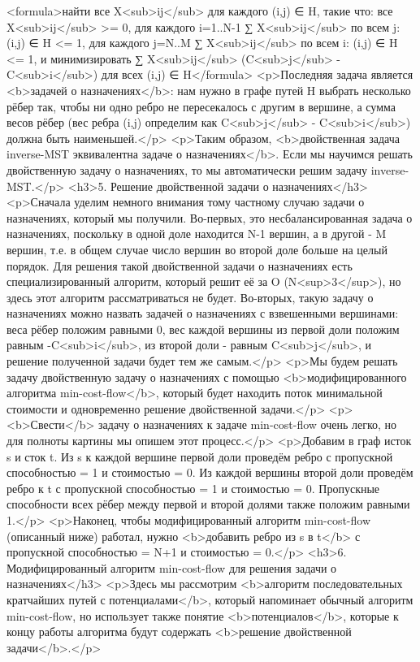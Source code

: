 <formula>найти все X<sub>ij</sub> для каждого (i,j) ∈ H, такие что:
все X<sub>ij</sub> >= 0,
для каждого i=1..N-1 ∑ X<sub>ij</sub> по всем j: (i,j) ∈ H <= 1,
для каждого j=N..M ∑ X<sub>ij</sub> по всем i: (i,j) ∈ H <= 1,
и минимизировать ∑ X<sub>ij</sub> (C<sub>j</sub> - C<sub>i</sub>) для всех (i,j) ∈ H</formula>
<p>Последняя задача является <b>задачей о назначениях</b>: нам нужно в графе путей H выбрать несколько рёбер так, чтобы ни одно ребро не пересекалось с другим в вершине, а сумма весов рёбер (вес ребра (i,j) определим как C<sub>j</sub> - C<sub>i</sub>) должна быть наименьшей.</p>
<p>Таким образом, <b>двойственная задача inverse-MST эквивалентна задаче о назначениях</b>. Если мы научимся решать двойственную задачу о назначениях, то мы автоматически решим задачу inverse-MST.</p>
<h3>5. Решение двойственной задачи о назначениях</h3>
<p>Сначала уделим немного внимания тому частному случаю задачи о назначениях, который мы получили. Во-первых, это несбалансированная задача о назначениях, поскольку в одной доле находится N-1 вершин, а в другой - M вершин, т.е. в общем случае число вершин во второй доле больше на целый порядок. Для решения такой двойственной задачи о назначениях есть специализированный алгоритм, который решит её за O (N<sup>3</sup>), но здесь этот алгоритм рассматриваться не будет. Во-вторых, такую задачу о назначениях можно назвать задачей о назначениях с взвешенными вершинами: веса рёбер положим равными 0, вес каждой вершины из первой доли положим равным -C<sub>i</sub>, из второй доли - равным C<sub>j</sub>, и решение полученной задачи будет тем же самым.</p>
<p>Мы будем решать задачу двойственную задачу о назначениях с помощью <b>модифицированного алгоритма min-cost-flow</b>, который будет находить поток минимальной стоимости и одновременно решение двойственной задачи.</p>
<p><b>Свести</b> задачу о назначениях к задаче min-cost-flow очень легко, но для полноты картины мы опишем этот процесс.</p>
<p>Добавим в граф исток s и сток t. Из s к каждой вершине первой доли проведём ребро с пропускной способностью = 1 и стоимостью = 0. Из каждой вершины второй доли проведём ребро к t с пропускной способностью = 1 и стоимостью = 0. Пропускные способности всех рёбер между первой и второй долями также положим равными 1.</p>
<p>Наконец, чтобы модифицированный алгоритм min-cost-flow (описанный ниже) работал, нужно <b>добавить ребро из s в t</b> с пропускной способностью = N+1 и стоимостью = 0.</p>
<h3>6. Модифицированный алгоритм min-cost-flow для решения задачи о назначениях</h3>
<p>Здесь мы рассмотрим <b>алгоритм последовательных кратчайших путей с потенциалами</b>, который напоминает обычный алгоритм min-cost-flow, но использует также понятие <b>потенциалов</b>, которые к концу работы алгоритма будут содержать <b>решение двойственной задачи</b>.</p>
